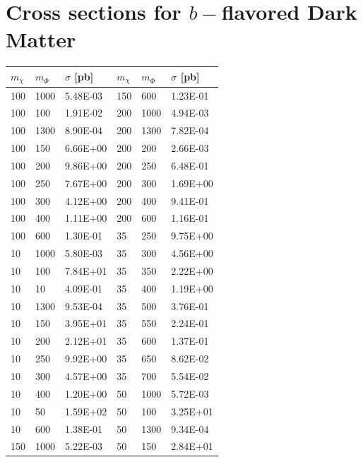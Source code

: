 \section{\texorpdfstring{Cross sections for $b-$flavored Dark Matter}{Cross sections for b-flavored Dark Matter}}
\label{app:xsecs_bFDM}

\begin{table}[h]
	\centering
	\begin{tabular}{lll|lll}
		\hline \hline
		$m_\chi $  & $m_\Phi$ & $\sigma$ [pb] & $m_\chi $  & $m_\Phi$ & $\sigma$ [pb]\\ \hline \hline
		100 & 1000 & 5.48E-03 & 150 & 600  & 1.23E-01 \\\hline
		100 & 100  & 1.91E-02 & 200 & 1000 & 4.94E-03 \\\hline
		100 & 1300 & 8.90E-04 & 200 & 1300 & 7.82E-04 \\\hline
		100 & 150  & 6.66E+00 & 200 & 200  & 2.66E-03 \\\hline
		100 & 200  & 9.86E+00 & 200 & 250  & 6.48E-01 \\\hline
		100 & 250  & 7.67E+00 & 200 & 300  & 1.69E+00 \\\hline
		100 & 300  & 4.12E+00 & 200 & 400  & 9.41E-01 \\\hline
		100 & 400  & 1.11E+00 & 200 & 600  & 1.16E-01 \\\hline
		100 & 600  & 1.30E-01 & 35  & 250  & 9.75E+00 \\\hline
		10  & 1000 & 5.80E-03 & 35  & 300  & 4.56E+00 \\\hline
		10  & 100  & 7.84E+01 & 35  & 350  & 2.22E+00 \\\hline
		10  & 10   & 4.09E-01 & 35  & 400  & 1.19E+00 \\\hline
		10  & 1300 & 9.53E-04 & 35  & 500  & 3.76E-01 \\\hline
		10  & 150  & 3.95E+01 & 35  & 550  & 2.24E-01 \\\hline
		10  & 200  & 2.12E+01 & 35  & 600  & 1.37E-01 \\\hline
		10  & 250  & 9.92E+00 & 35  & 650  & 8.62E-02 \\\hline
		10  & 300  & 4.57E+00 & 35  & 700  & 5.54E-02 \\\hline
		10  & 400  & 1.20E+00 & 50  & 1000 & 5.72E-03 \\\hline
		10  & 50   & 1.59E+02 & 50  & 100  & 3.25E+01 \\\hline
		10  & 600  & 1.38E-01 & 50  & 1300 & 9.34E-04 \\\hline
		150 & 1000 & 5.22E-03 & 50  & 150  & 2.84E+01 \\\hline

\end{tabular}
\end{table}
